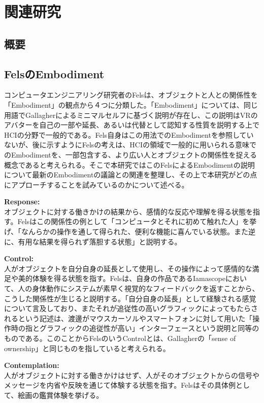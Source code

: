 \chapter{関連研究}
\label{related_works}
\section{概要}

\section{FelsのEmbodiment}
コンピュータエンジニアリング研究者のFelsは、オブジェクトと人との関係性を「Embodiment」の観点から４つに分類した。「Embodiment」については、同じ用語でGallagherによるミニマルセルフに基づく説明が存在し、この説明はVRのアバターを自己の一部や延長、あるいは代替として認知する性質を説明する上でHCIの分野で一般的である。Fels自身はこの用法でのEmbodimentを参照していないが、後に示すようにFelsの考えは、HCIの領域で一般的に用いられる意味でのEmbodimentを、一部包含する、より広い人とオブジェクトの関係性を捉える概念であると考えられる。そこで本研究ではこのFelsによるEmbodimentの説明について最新のEmbodimentの議論との関連を整理し、その上で本研究がどの点にアプローチすることを試みているのかについて述べる。

\textbf{Response:}\\
オブジェクトに対する働きかけの結果から、感情的な反応や理解を得る状態を指す。Felsはこの関係性の例として「コンピュータとそれに初めて触れた人」を挙げ、「なんらかの操作を通して得られた、便利な機能に喜んでいる状態。また逆に、有用な結果を得られず落胆する状態」と説明する。

\textbf{Control:}\\
人がオブジェクトを自分自身の延長として使用し、その操作によって感情的な満足や美的体験を得る状態を指す。Felsは、自身の作品であるIamascopeにおいて、人の身体動作にシステムが素早く視覚的なフィードバックを返すことから、こうした関係性が生じると説明する。「自分自身の延長」として経験される感覚について言及しており、またそれが追従性の高いグラフィックによってもたらされるという記述は、渡邊がマウスカーソルやスマートフォンに対して用いた「操作時の指とグラフィックの追従性が高い」インターフェースという説明と同等のものである。このことからFelsのいうControlとは、Gallagherの「sense of ownership」と同じものを指していると考えられる。

\textbf{Contemplation:}\\
人がオブジェクトに対する働きかけはせず、人がそのオブジェクトからの信号やメッセージを内省や反映を通じて体験する状態を指す。Felsはその具体例として、絵画の鑑賞体験を挙げる。

